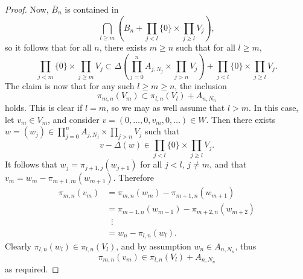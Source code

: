 \documentclass[10pt,a4paper]{amsart}
\begin{document}
\begin{proof}
Now, $\overline{B}_n$ is contained in
\[  \bigcap_{l\geq m} \left( B_n + \prod_{j<l} \{0\} \times \prod_{j\geq l} V_j\right), \]
so it follows that for all $n$, there exists $m\geq n$ such that for all $l\geq m$, 
\[\prod_{j<m} \{0\}\times \prod_{j\geq m} V_j \subset \Delta\left(\prod_{j=0}^n A_{j,N_j}\times \prod_{j> n} V_j\right) +   \prod_{j<l} \{0\} \times \prod_{j\geq l} V_j.  \]
The claim is now that for any such $l \geq m\geq n$, the inclusion
\[  \pi_{m,n}(V_m)\subset \pi_{l,n}(V_l)+A_{n,N_n} \]
holds. This is clear if $l=m$, so we may as well assume that $l>m$. In this case, let $v_m\in V_m$, and consider $v=(0,\ldots,0,v_m,0,\ldots)\in W$. Then there exists $w=(w_j) \in \prod_{j=0}^n A_{j,N_j}\times \prod_{j> n} V_j$ such that
\[ v-\Delta(w) \in \prod_{j<l} \{0\} \times \prod_{j\geq l} V_j.\]
It follows that $w_j=\pi_{j+1,j}(w_{j+1})$ for all $j<l$, $j\neq m$, and that $v_m=w_m-\pi_{m+1,m}(w_{m+1})$. Therefore
\begin{align*} \pi_{m,n}(v_m) &=  \pi_{m,n}(w_m)-\pi_{m+1,n}(w_{m+1}) \\
&= \pi_{m-1,n}(w_{m-1})-\pi_{m+2,n}(w_{m+2}) \\
& \;\;\vdots \\
&= w_n - \pi_{l,n}(w_l).
\end{align*}
Clearly $\pi_{l,n}(w_l)\in \pi_{l,n}(V_{l})$, and by assumption $w_n\in A_{n,N_n}$, thus
\[ \pi_{m,n}(v_m) \in \pi_{l,n}(V_l)+A_{n,N_n} \]
as required.
\end{proof}
\end{document}
